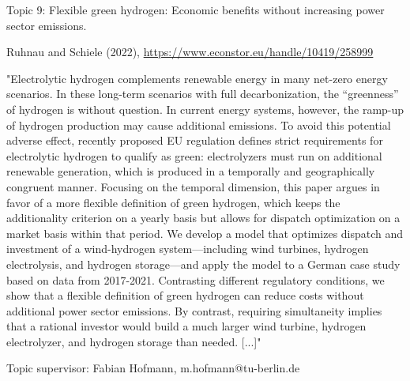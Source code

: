 \documentclass[10pt,aspectratio=169,dvipsnames]{beamer}
\begin{document}
\begin{frame}
  \begin{block}{Topic 9: Flexible green hydrogen: Economic benefits without increasing power sector emissions.}
      
    Ruhnau and Schiele (2022), 
    \href{https://www.econstor.eu/handle/10419/258999}{https://www.econstor.eu/handle/10419/258999}
    
    "Electrolytic hydrogen complements renewable energy in many net-zero energy scenarios. In these long-term scenarios with full decarbonization, the “greenness” of hydrogen is without question. In current energy systems, however, the ramp-up of hydrogen production may cause additional emissions. To avoid this potential adverse effect, recently proposed EU regulation defines strict requirements for electrolytic hydrogen to qualify as green: electrolyzers must run on additional renewable generation, which is produced in a temporally and geographically congruent manner. Focusing on the temporal dimension, this paper argues in favor of a more flexible definition of green hydrogen, which keeps the additionality criterion on a yearly basis but allows for dispatch optimization on a market basis within that period. We develop a model that optimizes dispatch and investment of a wind-hydrogen system—including wind turbines, hydrogen electrolysis, and hydrogen storage—and apply the model to a German case study based on data from 2017-2021. Contrasting different regulatory conditions, we show that a flexible definition of green hydrogen can reduce costs without additional power sector emissions. By contrast, requiring simultaneity implies that a rational investor would build a much larger wind turbine, hydrogen electrolyzer, and hydrogen storage than needed. [...]"

    \hfill
    Topic supervisor:  Fabian Hofmann, m.hofmann@tu-berlin.de
    
  \end{block}
\end{frame}
\end{document}
